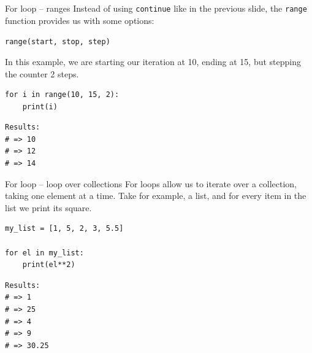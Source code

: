 \documentclass[10pt]{beamer}
\begin{document}
\begin{frame}[label={sec:org89793b6},fragile]{For loop -- ranges}
 Instead of using \texttt{continue} like in the previous slide, the \texttt{range} function provides us
with some options:

\texttt{range(start, stop, step)}

In this example, we are starting our iteration at 10, ending at 15, but stepping the
counter 2 steps.

\begin{verbatim}
for i in range(10, 15, 2):
    print(i)
\end{verbatim}

\begin{verbatim}
Results: 
# => 10
# => 12
# => 14
\end{verbatim}
\end{frame}

\begin{frame}[label={sec:orgb7e0fb4},fragile]{For loop -- loop over collections}
 For loops allow us to iterate over a collection, taking one element at a time. Take
for example, a list, and for every item in the list we print its square.

\begin{verbatim}
my_list = [1, 5, 2, 3, 5.5]

for el in my_list:
    print(el**2)
\end{verbatim}

\begin{verbatim}
Results: 
# => 1
# => 25
# => 4
# => 9
# => 30.25
\end{verbatim}
\end{frame}
\end{document}

